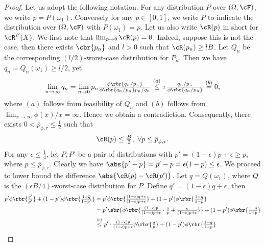 \documentclass[9pt]{article} %
\numberwithin{equation}{section}
\renewcommand{\frac}[2]{\tfrac{#1}{#2}}
\begin{document}
\begin{proof}
Let us adopt the following notation.
For any distribution 
$P$ over $(\Omega, \cF)$, we write $p = P(\omega_1)$.
Conversely for any $p \in [0,1]$, we write $P$ to indicate the distribution over $(\Omega,\cF)$ with $P(\omega_1) = p$. 
Let us also write $\cR(p)$ in short for $\cR^P(X)$.
We first note that 
$
\lim_{p \to 0} \cR(p) = 0.
$
Indeed, suppose this is not the case, then there exists $\cbr{p_n}$ and $l > 0$ such that $\cR(p_n) \geq l B$.
Let $Q_n$ be the corresponding $({l}/{2})$-worst-case distribution for $P_n$. Then we have $q_n = Q_n(\omega_1) \geq l/2$, yet 
\begin{align*}
\lim_{n \to \infty} q_n = \lim_{n \to 0} p_n  \frac{\phi\rbr{{q_n}/{p_n}} }{\phi\rbr{{q_n}/{p_n}}  p_n / q_n}
\overset{(a)}{\leq} \tau \frac{ q_n /p_n}{ \phi\rbr{{q_n}/{p_n}}} \overset{(b)}{=} 0, 
\end{align*}
where $(a)$ follows from feasibility of $Q_n$ and $(b)$ follows from $\lim_{x \to \infty} \phi(x) / x = \infty$. Hence we obtain a contradiction. 
Consequently, there exists $0< \overline{p}_{\phi,\tau} \leq \frac{1}{2} $ such that 
\begin{align}\label{risk_ub_uniform}
\cR(p) \leq \frac{B}{2}, ~ \forall p \leq \overline{p}_{\phi,\tau}.
\end{align} 
For any $\epsilon \leq \frac{1}{4}$, let $P, P'$ be a pair of distributions with $p' = (1-\epsilon) p + \epsilon \geq p$, where $p \leq \overline{p}_{\phi,\tau}$. 
Clearly we have 
$\abs{p' - p} = p' -  p = \epsilon (1-p) \leq \epsilon$. We proceed to lower bound the difference $\abs{\cR(p) - \cR(p') }$. 
Let $q = Q(\omega_1)$, where $Q$ is the $(\epsilon B/4)$-worst-case distribution for $P$. 
Define $q' = (1-\epsilon) q + \epsilon$, then
\begin{align*}
p' \phi \rbr{\frac{q'}{p'}} + (1-p') \phi \rbr{\frac{{1- \overline q}}{1- p'}} 
& =
p' \phi \rbr{\frac{ (1-\epsilon) q + \epsilon}{(1-\epsilon) p + \epsilon}} + (1-p') \phi \rbr{\frac{ 1-q}{1-p}} \\
& = 
p'\sbr{ \phi \rbr{\frac{ (1-\epsilon) p}{(1-\epsilon) p + \epsilon} \cdot \frac{q}{p}  +  \frac{ \epsilon}{(1-\epsilon) p + \epsilon}   }  } + (1-p') \phi \rbr{\frac{ 1-q}{1-p}} \\
& \overset{(c)}{\leq} p' \cdot \frac{ (1-\epsilon) p}{(1-\epsilon) p + \epsilon} \phi \rbr{\frac{q}{p}} + (1-p') \phi \rbr{\frac{ 1-q}{1-p}} \\

\end{align*}
\end{proof}
\end{document}
